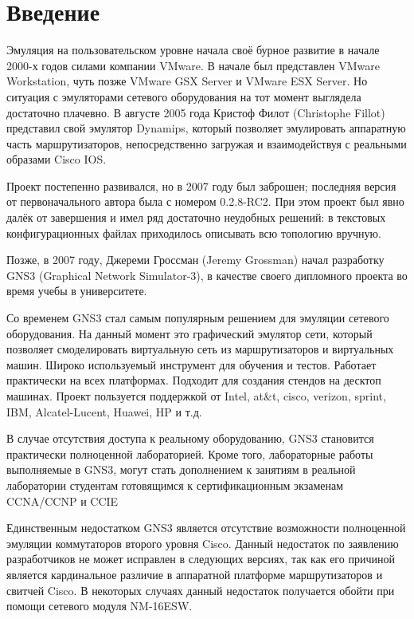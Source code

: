 \documentclass[a4paper, 12pt]{article}		%
\begin{document}

\tableofcontents

%

\newpage
\section*{Введение}

Эмуляция на пользовательском уровне начала своё бурное развитие в начале 2000-х годов силами компании VMware. В начале был представлен VMware Workstation, чуть позже VMware GSX Server и VMware ESX Server. Но ситуация с эмуляторами сетевого оборудования на тот момент выглядела достаточно плачевно.
В августе 2005 года Кристоф Филот (Christophe Fillot) представил свой эмулятор Dynamips, который позволяет эмулировать аппаратную часть маршрутизаторов, непосредственно загружая и взаимодействуя с реальными образами Cisco IOS. 

Проект постепенно развивался, но в 2007 году был заброшен; последняя версия от первоначального автора была с номером 0.2.8-RC2. При этом проект был явно далёк от завершения и имел ряд достаточно неудобных решений: в текстовых конфигурационных файлах приходилось описывать всю топологию вручную.

Позже, в 2007 году, Джереми Гроссман (Jeremy Grossman) начал разработку GNS3 (Graphical Network Simulator-3), в качестве своего дипломного проекта во время учебы в университете.

Со временем GNS3 стал самым популярным решением для эмуляции сетевого оборудования. На данный момент это графический эмулятор сети, который позволяет смоделировать виртуальную сеть из маршрутизаторов и виртуальных машин. Широко используемый инструмент для обучения и тестов. Работает практически на всех платформах. Подходит для создания стендов на десктоп машинах. Проект пользуется поддержкой от Intel, at\&t, cisco, verizon, sprint, IBM, Alcatel-Lucent, Huawei, HP и т.д.

В случае отсутствия доступа к реальному оборудованию, GNS3 становится практически полноценной лабораторией. Кроме того, лабораторные работы выполняемые в GNS3, могут стать дополнением к занятиям в реальной лаборатории студентам готовящимся к сертификационным экзаменам CCNA/CCNP и CCIE

Единственным недостатком GNS3  является отсутствие возможности полноценной эмуляции коммутаторов второго уровня Cisco. Данный недостаток по заявлению разработчиков не может исправлен в следующих версиях, так как его причиной является кардинальное различие в аппаратной платформе маршрутизаторов и свитчей Cisco. В некоторых случаях данный недостаток получается обойти при помощи сетевого модуля NM-16ESW.
\end{document}
